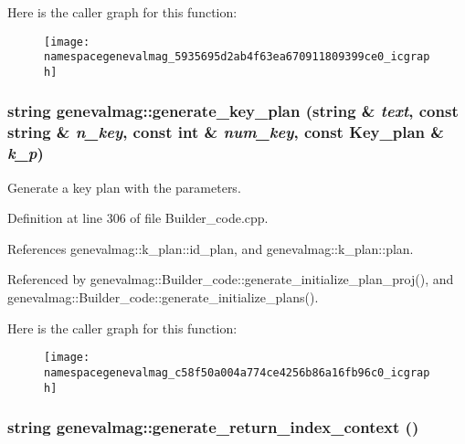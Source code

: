 Here is the caller graph for this function:\nopagebreak
\begin{figure}[H]
\begin{center}
\leavevmode
\texttt{[image: namespacegenevalmag\_5935695d2ab4f63ea670911809399ce0\_icgraph]}
\end{center}
\end{figure}
\hypertarget{namespacegenevalmag_c58f50a004a774ce4256b86a16fb96c0}{
\subsubsection[{generate\_\-key\_\-plan}]{\setlength{\rightskip}{0pt plus 5cm}string genevalmag::generate\_\-key\_\-plan (string \& {\em text}, \/  const string \& {\em n\_\-key}, \/  const int \& {\em num\_\-key}, \/  const {\bf Key\_\-plan} \& {\em k\_\-p})}}
\label{namespacegenevalmag_c58f50a004a774ce4256b86a16fb96c0}


Generate a key plan with the parameters. 

Definition at line 306 of file Builder\_\-code.cpp.

References genevalmag::k\_\-plan::id\_\-plan, and genevalmag::k\_\-plan::plan.

Referenced by genevalmag::Builder\_\-code::generate\_\-initialize\_\-plan\_\-proj(), and genevalmag::Builder\_\-code::generate\_\-initialize\_\-plans().

Here is the caller graph for this function:\nopagebreak
\begin{figure}[H]
\begin{center}
\leavevmode
\texttt{[image: namespacegenevalmag\_c58f50a004a774ce4256b86a16fb96c0\_icgraph]}
\end{center}
\end{figure}
\hypertarget{namespacegenevalmag_d027bb2060fc75b17da08a22c9be3b9a}{
\subsubsection[{generate\_\-return\_\-index\_\-context}]{\setlength{\rightskip}{0pt plus 5cm}string genevalmag::generate\_\-return\_\-index\_\-context ()}}
\label{namespacegenevalmag_d027bb2060fc75b17da08a22c9be3b9a}


